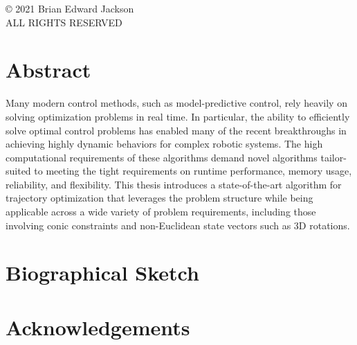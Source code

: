 \documentclass[10pt,oneside]{book}
\begin{document}
    

    \frontmatter
    
    \newpage
    \pagestyle{empty}
    \begin{center}
    \copyright{} 2021 Brian Edward Jackson \\
    ALL RIGHTS RESERVED
    \end{center}
    
    \chapter*{Abstract}
    Many modern control methods, such as model-predictive control, rely heavily
    on solving optimization problems in real time. In particular, the ability to
    efficiently solve optimal control problems has enabled many of the recent
    breakthroughs in achieving highly dynamic behaviors for complex robotic
    systems. The high computational requirements of these algorithms demand novel
    algorithms tailor-suited to meeting the tight requirements on runtime
    performance, memory usage, reliability, and flexibility. This thesis
    introduces a state-of-the-art algorithm for trajectory optimization that
    leverages the problem structure while being applicable across a wide variety
    of problem requirements, including those involving conic constraints and
    non-Euclidean state vectors such as 3D rotations.


    \pagebreak
    \hspace{0pt}
    \vfill
    \vfill
    \hspace{0pt}
    \pagebreak

    \chapter*{Biographical Sketch}

    \chapter*{Acknowledgements}

    \tableofcontents
    \listoffigures
    \listoftables
\end{document}
